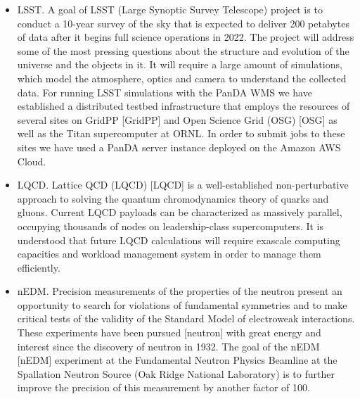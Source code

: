 \begin{itemize}
(BBP) [BBP] of the Ecole Polytechnique Federal de Lausanne (EPFL) located in
Lausanne, Switzerland. This proof of concept project is aimed at demonstrating
the efficient application of the BigPanDA system to support the complex
scientific workflow of the BBP which relies on using a mix of desktop, cluster
and supercomputers to reconstruct and simulate accurate models of brain tissue.
In the first phase of this joint project we supported the execution of BBP
software on a variety of distributed computing systems powered by BigPanDA. The
targeted systems for demonstration included: Intel x86-NVIDIA GPU based BBP
clusters located in Geneva (47 TFlops) and Lugano (81 TFlops), BBP IBM
BlueGene/Q supercomputer [BlueGene](0.78 PFLops and 65 TB of DRAM memory)
located in Lugano, the Titan Supercomputer with peak theoretical performance 27
PFlops operated by the Oak Ridge Leadership Computing Facility (OLCF), and
Cloud based resources such as Amazon Cloud.
    \item LSST.
A goal of LSST (Large Synoptic Survey Telescope) project is to conduct a
10-year survey of the sky that is expected to deliver 200 petabytes of data
after it begins full science operations in 2022. The project  will address some
of the most pressing questions about the structure and evolution of the
universe and the objects in it. It will require a large amount of simulations,
which model the atmosphere, optics and camera to understand the collected data.
For running LSST simulations with the PanDA WMS we have established a
distributed testbed infrastructure that employs the resources of several sites
on GridPP [GridPP] and Open Science Grid (OSG) [OSG] as well as the Titan
supercomputer at ORNL. In order to submit jobs to these sites we have used a
PanDA server instance deployed on the Amazon AWS Cloud.
    \item LQCD.
Lattice QCD (LQCD) [LQCD] is a well-established non-perturbative approach to
solving the quantum chromodynamics theory of quarks and gluons. Current LQCD
payloads can be characterized as massively parallel, occupying thousands of
nodes on leadership-class supercomputers. It is understood that future LQCD
calculations will require exascale computing capacities and workload management
system in order to manage them efficiently.
    \item nEDM.
Precision measurements of the properties of the neutron present an opportunity
to search for violations of fundamental symmetries and to make critical tests
of the validity of the Standard Model of electroweak interactions. These
experiments have been pursued [neutron] with great energy and interest since
the discovery of neutron in 1932. The goal of the nEDM [nEDM] experiment at the
Fundamental Neutron Physics Beamline at the Spallation Neutron Source (Oak
Ridge National Laboratory) is to further improve the precision of this
measurement by another factor of 100.
\end{itemize}


